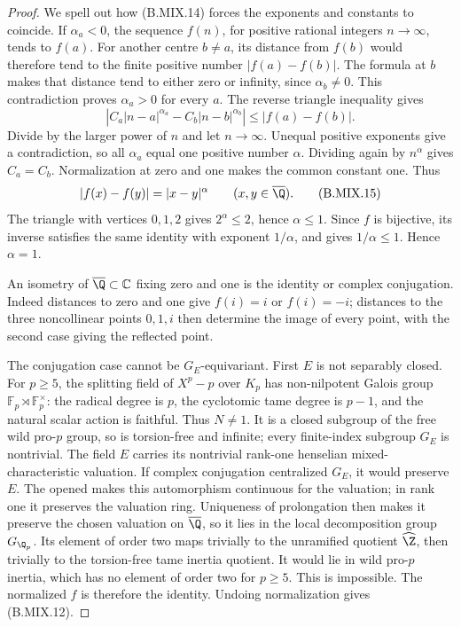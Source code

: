 \begin{proof}
We spell out how (B.MIX.14) forces the exponents and constants
to coincide. If \(\alpha_a<0\), the sequence \(f(n)\), for
positive rational integers \(n\to\infty\), tends to \(f(a)\).
For another centre \(b\ne a\), its distance from \(f(b)\)
would therefore tend to the finite positive number
\(|f(a)-f(b)|\). The formula at \(b\) makes that distance
tend to either zero or infinity, since \(\alpha_b\ne0\).
This contradiction proves \(\alpha_a>0\) for every \(a\).
The reverse triangle inequality gives
\[
 \left|C_a|n-a|^{\alpha_a}-C_b|n-b|^{\alpha_b}\right|
                      \leq |f(a)-f(b)|.
\]
Divide by the larger power of \(n\) and let \(n\to\infty\).
Unequal positive exponents give a contradiction, so all
\(\alpha_a\) equal one positive number \(\alpha\).
Dividing again by \(n^\alpha\) gives \(C_a=C_b\).
Normalization at zero and one makes the common constant one.
Thus
\[
                       |f(x)-f(y)|=|x-y|^\alpha
                       \qquad(x,y\in\overline\Q).       \tag{B.MIX.15}
\]
The triangle with vertices \(0,1,2\) gives
\(2^\alpha\leq2\), hence \(\alpha\leq1\).
Since \(f\) is bijective, its inverse satisfies the same
identity with exponent \(1/\alpha\), and gives
\(1/\alpha\leq1\). Hence \(\alpha=1\).

An isometry of \(\overline\Q\subset\mathbb C\) fixing
zero and one is the identity or complex conjugation.
Indeed distances to zero and one give \(f(i)=i\) or
\(f(i)=-i\); distances to the three noncollinear points
\(0,1,i\) then determine the image of every point, with
the second case giving the reflected point.

The conjugation case cannot be \(G_E\)-equivariant.
First \(E\) is not separably closed. For \(p\geq5\),
the splitting field of \(X^p-p\) over \(K_p\) has
non-nilpotent Galois group
\(\mathbb F_p\rtimes\mathbb F_p^\times\): the radical
degree is \(p\), the cyclotomic tame degree is \(p-1\),
and the natural scalar action is faithful. Thus \(N\ne1\).
It is a closed subgroup of the free wild pro-\(p\) group,
so is torsion-free and infinite; every finite-index subgroup
\(G_E\) is nontrivial. The field \(E\) carries its
nontrivial rank-one henselian mixed-characteristic valuation.
If complex conjugation centralized \(G_E\), it would
preserve \(E\). The opened
\citep[Lemma~2.1]{KhassaKhanduja2010} makes this automorphism
continuous for the valuation; in rank one it preserves the
valuation ring. Uniqueness of prolongation then makes it
preserve the chosen valuation on \(\overline\Q\), so it
lies in the local decomposition group \(G_{\Q_p}\).
Its element of order two maps trivially to the unramified
quotient \(\widehat\Z\), then trivially to the torsion-free
tame inertia quotient. It would lie in wild pro-\(p\)
inertia, which has no element of order two for \(p\geq5\).
This is impossible. The normalized \(f\) is therefore the
identity. Undoing normalization gives (B.MIX.12).
\end{proof}

